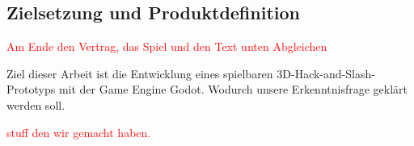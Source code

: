 \documentclass[../Main.tex]{subfiles}
\begin{document}
\subsection{Zielsetzung und Produktdefinition}

\textcolor{red}{Am Ende den Vertrag, das Spiel und den Text unten Abgleichen}

Ziel dieser Arbeit ist die Entwicklung eines spielbaren 3D-Hack-and-Slash-Prototyps mit der Game Engine Godot. Wodurch unsere Erkenntnisfrage geklärt werden soll.

\textcolor{red}{stuff den wir gemacht haben.}



\newpage
\end{document}
